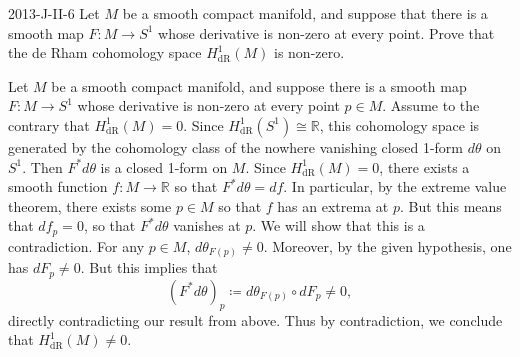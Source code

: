 \documentclass{article}
\begin{document}
	\begin{prb}{2013-J-II-6}
		Let $M$ be a smooth compact manifold, and suppose that there is a smooth map $F: M \to S^{1}$ whose derivative is non-zero at every point. Prove that the de Rham cohomology space $H^{1}_{\text{dR}}(M)$ is non-zero. 
	\end{prb}
	Let $M$ be a smooth compact manifold, and suppose there is a smooth map $F: M \to S^{1}$ whose derivative is non-zero at every point $p \in M$. Assume to the contrary that $H^{1}_{\text{dR}}(M) = 0$. Since $H^{1}_{\text{dR}}(S^{1}) \cong \mathbb{R}$, this cohomology space is generated by the cohomology class of the nowhere vanishing closed 1-form $d\theta$ on $S^{1}$. Then $F^{\ast}d\theta$ is a closed 1-form on $M$. Since $H^{1}_{\text{dR}}(M) = 0$, there exists a smooth function $f: M \to \mathbb{R}$ so that $F^{\ast}d\theta = df$. In particular, by the extreme value theorem, there exists some $p \in M$ so that $f$ has an extrema at $p$. But this means that $df_{p} = 0$, so that $F^{\ast}d\theta$ vanishes at $p$. We will show that this is a contradiction. For any $p \in M$, $d\theta_{F(p)} \neq 0$. Moreover, by the given hypothesis, one has $dF_{p} \neq 0$. But this implies that 
	\begin{equation*}
		(F^{\ast}d\theta)_{p} \coloneqq d\theta_{F(p)} \circ dF_{p} \neq 0, 
	\end{equation*}
	directly contradicting our result from above. Thus by contradiction, we conclude that $H^{1}_{\text{dR}}(M) \neq 0$. 
	
\end{document}
